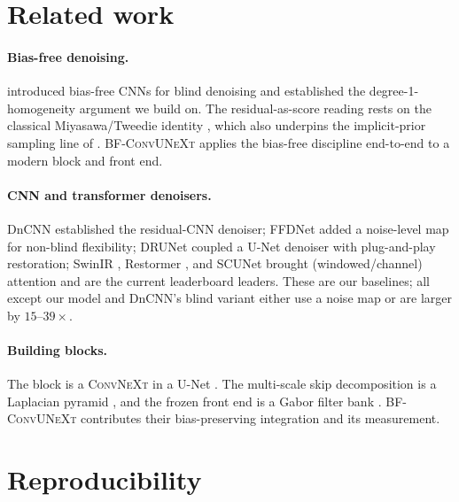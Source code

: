 \documentclass{article}
\newcommand{\model}{\textsc{BF-ConvUNeXt}}
\newcommand{\convnext}{\textsc{ConvNeXt}}
\begin{document}
\section{Related work}
\label{sec:related}

\paragraph{Bias-free denoising.}
\citet{mohan2020biasfree} introduced bias-free CNNs for blind denoising and established the degree-1-homogeneity argument we build on. The residual-as-score reading rests on the classical Miyasawa/Tweedie identity \citep{miyasawa1961,robbins1956}, which also underpins the implicit-prior sampling line of \citet{kadkhodaie2021stochastic}. \model{} applies the bias-free discipline end-to-end to a modern block and front end.

\paragraph{CNN and transformer denoisers.}
DnCNN \citep{zhang2017dncnn} established the residual-CNN denoiser; FFDNet \citep{zhang2018ffdnet} added a noise-level map for non-blind flexibility; DRUNet \citep{zhang2021plugandplay} coupled a U-Net denoiser with plug-and-play restoration; SwinIR \citep{liang2021swinir}, Restormer \citep{zamir2022restormer}, and SCUNet \citep{zhang2022scunet} brought (windowed/channel) attention and are the current leaderboard leaders. These are our baselines; all except our model and DnCNN's blind variant either use a noise map or are larger by $15$--$39\times$.

\paragraph{Building blocks.}
The block is a \convnext{} \citep{liu2022convnext} in a U-Net \citep{ronneberger2015unet}. The multi-scale skip decomposition is a Laplacian pyramid \citep{burt1983laplacian}, and the frozen front end is a Gabor filter bank \citep{gabor1946}. \model{} contributes their bias-preserving integration and its measurement.

\section{Reproducibility}
\label{sec:repro}
\end{document}
